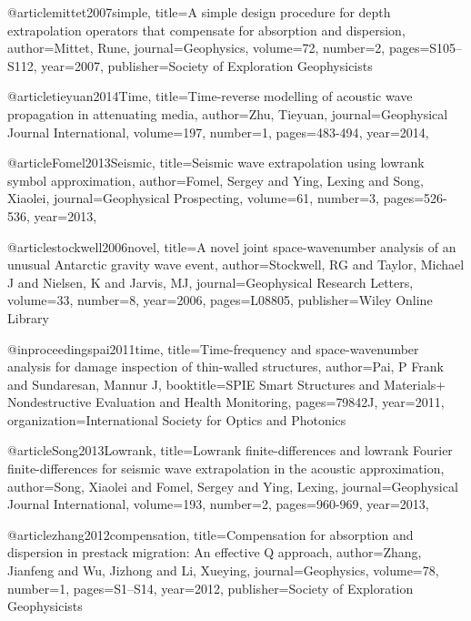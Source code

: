 @article{mittet2007simple,
  title={A simple design procedure for depth extrapolation operators that compensate for absorption and dispersion},
  author={Mittet, Rune},
  journal={Geophysics},
  volume={72},
  number={2},
  pages={S105--S112},
  year={2007},
  publisher={Society of Exploration Geophysicists}
}

@article{tieyuan2014Time,
  title={Time-reverse modelling of acoustic wave propagation in attenuating media},
  author={Zhu, Tieyuan},
  journal={Geophysical Journal International},
  volume={197},
  number={1},
  pages={483-494},
  year={2014},
}

@article{Fomel2013Seismic,
  title={Seismic wave extrapolation using lowrank symbol approximation},
  author={Fomel, Sergey and Ying, Lexing and Song, Xiaolei},
  journal={Geophysical Prospecting},
  volume={61},
  number={3},
  pages={526-536},
  year={2013},
}

@article{stockwell2006novel,
  title={A novel joint space-wavenumber analysis of an unusual Antarctic gravity wave event},
  author={Stockwell, RG and Taylor, Michael J and Nielsen, K and Jarvis, MJ},
  journal={Geophysical Research Letters},
  volume={33},
  number={8},
  year={2006},
  pages={L08805},
  publisher={Wiley Online Library}
}

@inproceedings{pai2011time,
  title={Time-frequency and space-wavenumber analysis for damage inspection of thin-walled structures},
  author={Pai, P Frank and Sundaresan, Mannur J},
  booktitle={SPIE Smart Structures and Materials+ Nondestructive Evaluation and Health Monitoring},
  pages={79842J},
  year={2011},
  organization={International Society for Optics and Photonics}
}


@article{Song2013Lowrank,
  title={Lowrank finite-differences and lowrank {F}ourier finite-differences for seismic wave extrapolation in the acoustic approximation},
  author={Song, Xiaolei and Fomel, Sergey and Ying, Lexing},
  journal={Geophysical Journal International},
  volume={193},
  number={2},
  pages={960-969},
  year={2013},
}

@article{zhang2012compensation,
  title={Compensation for absorption and dispersion in prestack migration: {A}n effective {Q} approach},
  author={Zhang, Jianfeng and Wu, Jizhong and Li, Xueying},
  journal={Geophysics},
  volume={78},
  number={1},
  pages={S1--S14},
  year={2012},
  publisher={Society of Exploration Geophysicists}
}

